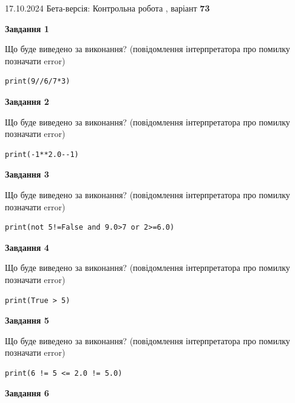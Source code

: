 \documentclass[12pt, ukrainian]{article}
\begin{document}
{\Large{17.10.2024 Бета-версія: Контрольна робота , варіант  \No \textbf { 73 }\par}}
{
\begin {large}
{\begin {center}\textbf{Завдання 1}\end {center}}

Що буде виведено за виконання? (повідомлення інтерпретатора про помилку позначати error)\par
\begin{verbatim}
print(9//6/7*3)
\end{verbatim}

{\begin {center}\textbf{Завдання 2}\end {center}}

Що буде виведено за виконання? (повідомлення інтерпретатора про помилку позначати error)\par
\begin{verbatim}
print(-1**2.0--1)
\end{verbatim}

{\begin {center}\textbf{Завдання 3}\end {center}}

Що буде виведено за виконання? (повідомлення інтерпретатора про помилку позначати error)\par
\begin{verbatim}
print(not 5!=False and 9.0>7 or 2>=6.0)
\end{verbatim}

{\begin {center}\textbf{Завдання 4}\end {center}}

Що буде виведено за виконання? (повідомлення інтерпретатора про помилку позначати error)\par
\begin{verbatim}
print(True > 5)
\end{verbatim}

{\begin {center}\textbf{Завдання 5}\end {center}}

Що буде виведено за виконання? (повідомлення інтерпретатора про помилку позначати error)\par
\begin{verbatim}
print(6 != 5 <= 2.0 != 5.0)
\end{verbatim}

{\begin {center}\textbf{Завдання 6}\end {center}}


\end{large}}
\end{document}
